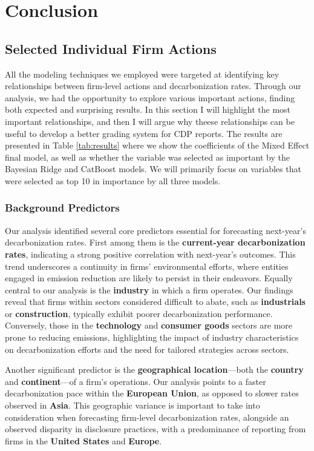 \chapter{Conclusion}
\label{chap:conclusion}

\section{Selected Individual Firm Actions}
All the modeling techniques we employed were targeted at identifying key relationships between firm-level actions and decarbonization rates. Through our analysis, we had the opportunity to explore various important actions, finding both expected and surprising results. In this section I will highlight the most important relationships, and then I will argue why theese relationships can be useful to develop a better grading system for CDP reports. The results are presented in Table \ref{tab:results} where we show the coefficients of the Mixed Effect final model, as well as whether the variable was selected as important by the Bayesian Ridge and CatBoost models. We will primarily focus on variables that were selected as top 10 in importance by all three models.


\subsection{Background Predictors}
Our analysis identified several core predictors essential for forecasting next-year's decarbonization rates. First among them is the \textbf{current-year decarbonization rates}, indicating a strong positive correlation with next-year's outcomes. This trend underscores a continuity in firms' environmental efforts, where entities engaged in emission reduction are likely to persist in their endeavors. Equally central to our analysis is the \textbf{industry} in which a firm operates. Our findings reveal that firms within sectors considered difficult to abate, such as \textbf{industrials} or \textbf{construction}, typically exhibit poorer decarbonization performance. Conversely, those in the \textbf{technology} and \textbf{consumer goods} sectors are more prone to reducing emissions, highlighting the impact of industry characteristics on decarbonization efforts and the need for tailored strategies across sectors.

Another significant predictor is the \textbf{geographical location}—both the \textbf{country} and \textbf{continent}—of a firm's operations. Our analysis points to a faster decarbonization pace within the \textbf{European Union}, as opposed to slower rates observed in \textbf{Asia}. This geographic variance is important to take into consideration when forecasting firm-level decarbonization rates, alongside an observed disparity in disclosure practices, with a predominance of reporting from firms in the \textbf{United States} and \textbf{Europe}.

